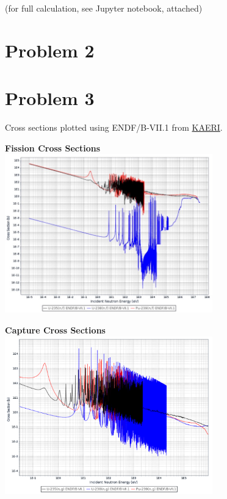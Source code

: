 \documentclass{article}
\newcommand{\tab}{\-\hspace{1cm}}
\begin{document}
(for full calculation, see Jupyter notebook, attached)


\section*{Problem 2}




\section*{Problem 3}

Cross sections plotted using ENDF/B-VII.1 from \href{http://atom.kaeri.re.kr/nuchart/}{KAERI}.

\begin{multicols}{2}
\tab\textbf{Fission Cross Sections}\\
\includegraphics[width=9cm]{fissionXS}

\tab\textbf{Capture Cross Sections}\\
\includegraphics[width=9cm]{captureXS}
\end{multicols}
\end{document}
